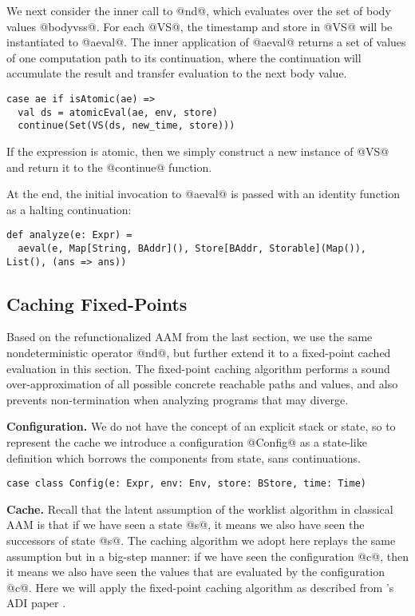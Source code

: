 \documentclass[acmsmall]{acmart}\settopmatter{}
\begin{document}
We next consider the inner call to @nd@, which evaluates over the set of body values @bodyvss@.
For each @VS@, the timestamp and store in @VS@ will be instantiated to
@aeval@.
The inner application of @aeval@ returns a set of values of one computation path to its
continuation, where the continuation will accumulate the result and transfer
evaluation to the next body value.

\begin{lstlisting}
case ae if isAtomic(ae) =>
  val ds = atomicEval(ae, env, store)
  continue(Set(VS(ds, new_time, store)))
\end{lstlisting}

If the expression is atomic, then we simply construct a new instance of
@VS@ and return it to the @continue@ function.

At the end, the initial invocation to @aeval@ is passed with an identity
function as a halting continuation:
\begin{lstlisting}
def analyze(e: Expr) =
  aeval(e, Map[String, BAddr](), Store[BAddr, Storable](Map()), List(), (ans => ans))
\end{lstlisting}

\subsection{Caching Fixed-Points}

Based on the refunctionalized AAM from the last section, we use the same nondeterministic
operator @nd@, but further extend it to a fixed-point cached evaluation in this section.
The fixed-point caching algorithm performs a sound over-approximation of all possible
concrete reachable paths and values, and also prevents non-termination when analyzing 
programs that may diverge.

\textbf{Configuration.}
We do not have the concept of an explicit stack or state,
so to represent the cache we introduce a configuration @Config@ as
a state-like definition which borrows the components from state, sans continuations.
\begin{lstlisting}
case class Config(e: Expr, env: Env, store: BStore, time: Time)
\end{lstlisting}

\textbf{Cache.}
Recall that the latent assumption of the worklist algorithm in classical AAM
is that if we have seen a state @s@, it means we also have seen the successors
of state @s@.
The caching algorithm we adopt here replays the same assumption but in a big-step
manner: if we have seen the configuration @c@, then it means we also have seen
the values that are evaluated by the configuration @c@.
Here we will apply the fixed-point caching algorithm as described from
\citeauthor{darais2017abstracting}'s ADI paper \cite{darais2017abstracting}.
\end{document}
